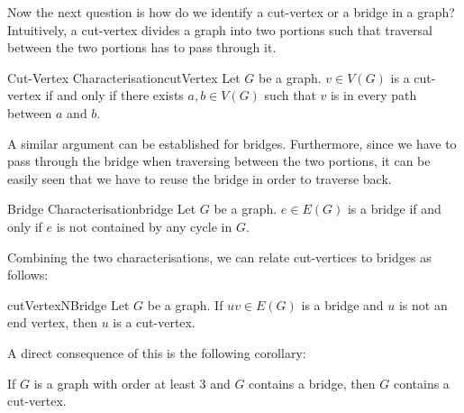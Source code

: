 \documentclass[math]{amznotes}
\theoremstyle{remark}
\begin{document}
Now the next question is how do we identify a cut-vertex or a bridge in a graph? Intuitively, a cut-vertex divides a graph into two portions such that traversal between the two portions has to pass through it.
\begin{thmbox}{Cut-Vertex Characterisation}{cutVertex}
    Let $G$ be a graph. $v \in V(G)$ is a cut-vertex if and only if there exists $a, b \in V(G)$ such that $v$ is in every path between $a$ and $b$.
\end{thmbox}
A similar argument can be established for bridges. Furthermore, since we have to pass through the bridge when traversing between the two portions, it can be easily seen that we have to reuse the bridge in order to traverse back.
\begin{thmbox}{Bridge Characterisation}{bridge}
    Let $G$ be a graph. $e \in E(G)$ is a bridge if and only if $e$ is not contained by any cycle in $G$.
\end{thmbox}
Combining the two characterisations, we can relate cut-vertices to bridges as follows:
\begin{probox}{}{cutVertexNBridge}
    Let $G$ be a graph. If $uv \in E(G)$ is a bridge and $u$ is not an end vertex, then $u$ is a cut-vertex.
\end{probox}
A direct consequence of this is the following corollary:
\begin{corbox}{}{}
    If $G$ is a graph with order at least $3$ and $G$ contains a bridge, then $G$ contains a cut-vertex.
\end{corbox}
\end{document}
